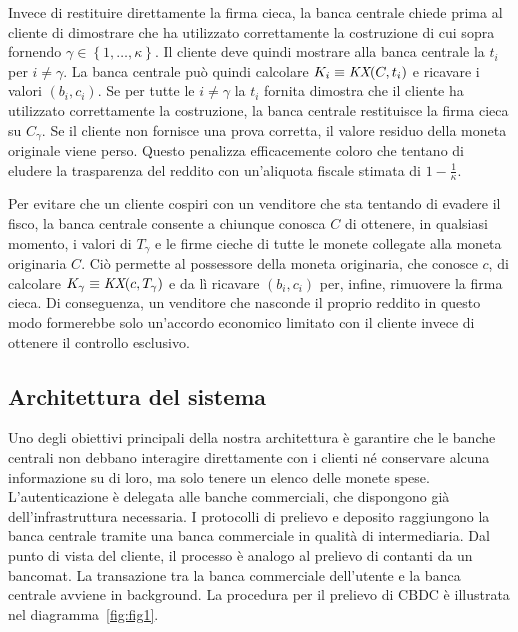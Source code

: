 \documentclass{article}
\begin{document}
Invece di restituire direttamente la firma cieca, la banca centrale 
chiede prima al cliente di dimostrare che ha utilizzato correttamente la 
costruzione di cui sopra fornendo 
$\gamma \in \left\{ 1,\ldots,\kappa \right\}$. 
Il cliente deve quindi mostrare alla banca centrale la 
$t_{i}$ per $i \neq \gamma$. 
La banca centrale può quindi calcolare 
$K_{i} \equiv \emph{KX}(C,t_{i})$ e ricavare i valori 
$(b_{i},c_{i})$. Se per tutte le 
$i \neq \gamma$ la $t_{i}$ fornita dimostra che il cliente ha utilizzato 
correttamente la costruzione, la banca centrale restituisce la firma 
cieca su $C_{\gamma}$. 
Se il cliente non fornisce una prova corretta, il valore residuo della 
moneta originale viene perso. Questo penalizza efficacemente coloro che 
tentano di eludere la trasparenza del reddito con un'aliquota fiscale 
stimata di $1 - \frac{1}{\kappa}$.

Per evitare che un cliente cospiri con un venditore che sta tentando di 
evadere il fisco, la banca centrale consente a chiunque 
conosca $C$ di ottenere, in qualsiasi momento, i valori di 
$T_{\gamma}$ 
e le firme cieche di tutte le monete collegate alla moneta originaria $C$. 
Ciò permette al possessore della moneta originaria, che conosce $c$, di 
calcolare 
$K_{\gamma} \equiv \emph{KX}( c,T_{\gamma})$ 
e da lì ricavare 
$(b_{i},c_{i})$ 
per, infine, rimuovere la firma cieca. Di conseguenza, un venditore che 
nasconde il proprio reddito in questo modo formerebbe solo un'accordo 
economico limitato con il cliente invece di ottenere il controllo esclusivo.

\hypertarget{architettura-del-sistema}{%
\subsection{Architettura del sistema}\label{architettura-del-sistema}}

Uno degli obiettivi principali della nostra architettura è garantire 
che le banche centrali non debbano interagire direttamente con i 
clienti né conservare alcuna informazione su di loro, ma solo tenere 
un elenco delle monete spese. L'autenticazione è delegata alle banche 
commerciali, che dispongono già dell'infrastruttura necessaria. I 
protocolli di prelievo e deposito raggiungono la banca centrale 
tramite una banca commerciale in qualità di intermediaria. Dal punto 
di vista del cliente, il processo è analogo al prelievo di contanti da 
un bancomat. La transazione tra la banca commerciale dell'utente e la 
banca centrale avviene in background. La procedura per il prelievo di 
CBDC è illustrata nel diagramma~\ref{fig:fig1}.
\end{document}
